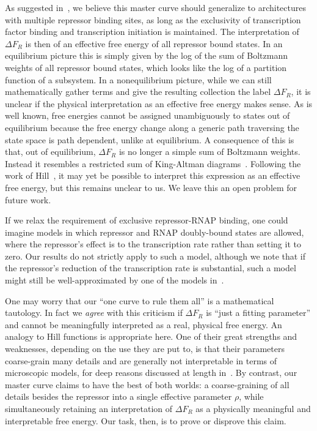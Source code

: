 As suggested in~\cite{Chure2019}, we believe this master curve should generalize
to architectures with multiple repressor binding sites, as long as the
exclusivity of transcription factor binding and transcription initiation is
maintained. The interpretation of $\Delta F_R$ is then of an effective free
energy of all repressor bound states. In an equilibrium picture this is simply
given by the log of the sum of Boltzmann weights of all repressor bound states,
which looks like the log of a partition function of a subsystem. In a
nonequilibrium picture, while we can still mathematically gather terms and give
the resulting collection the label $\Delta F_R$, it is unclear if the physical
interpretation as an effective free energy makes sense. As is well known, free
energies cannot be assigned unambiguously to states out of equilibrium because
the free energy change along a generic path traversing the state space is path
dependent, unlike at equilibrium. A consequence of this is that, out of
equilibrium, $\Delta F_R$ is no longer a simple sum of Boltzmann weights.
Instead it resembles a restricted sum of King-Altman diagrams~\cite{King1956,
Hill1966}. Following the work of Hill~\cite{Hill1989}, it may yet be possible to
interpret this expression as an effective free energy, but this remains unclear
to us. We leave this an open problem for future work.

If we relax the requirement of exclusive repressor-RNAP binding, one could
imagine models in which repressor and RNAP doubly-bound states are allowed,
where the repressor's effect is to  the transcription rate rather
than setting it to zero. Our results do not strictly apply to such a model,
although we note that if the repressor's reduction of the transcription rate is
substantial, such a model might still be well-approximated by one of the models
in~.

One may worry that our ``one curve to rule them all'' is a mathematical
tautology. In fact we \textit{agree} with this criticism if $\Delta F_R$ is
``just a fitting parameter'' and cannot be meaningfully interpreted as a real,
physical free energy. An analogy to Hill functions is appropriate here. One of
their great strengths and weaknesses, depending on the use they are put to, is
that their parameters coarse-grain many details and are generally not
interpretable in terms of microscopic models, for deep reasons discussed at
length in~\cite{Frank2013}. By contrast, our master curve claims to have the
best of both worlds: a coarse-graining of all details besides the repressor into
a single effective parameter $\rho$, while simultaneously retaining an
interpretation of $\Delta F_R$ as a physically meaningful and interpretable free
energy. Our task, then, is to prove or disprove this claim.

